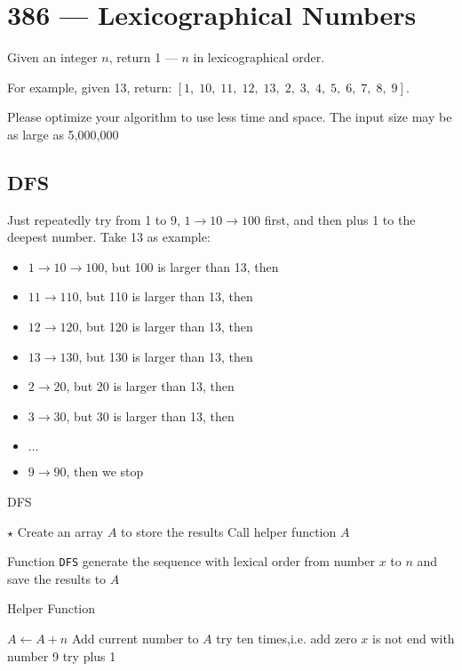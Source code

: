 \section{386 --- Lexicographical Numbers}
Given an integer $n$, return 1 --- $n$ in lexicographical order.
\par
For example, given 13, return: $[1,\;10,\;11,\;12,\;13,\;2,\;3,\;4,\;5,\;6,\;7,\;8,\;9]$.
\par
Please optimize your algorithm to use less time and space. The input size may be as large as 5,000,000

\subsection{DFS}
Just repeatedly try from 1 to 9, $1 \to 10 \to 100$ first, and then plus 1 to the deepest number. Take 13 as example:
\begin{itemize}
\item $1\to 10 \to 100$, but 100 is larger than 13, then
\item $11\to 110$, but 110 is larger than 13, then
\item $12\to 120$, but 120 is larger than 13, then
\item $13\to 130$, but 130 is larger than 13, then
\item $2 \to 20$, but 20 is larger than 13, then
\item $3 \to 30$, but 30 is larger than 13, then
\item $\ldots$
\item $9\to 90$, then we stop
\end{itemize}

\setcounter{algorithm}{0}
\begin{algorithm}[H]
\caption{DFS}
\begin{algorithmic}[1]
\State $\star$ Create an array $A$ to store the results
\State {} \Comment Call helper function
\State \Return $A$
\EndProcedure
\end{algorithmic}
\end{algorithm}

Function \texttt{DFS} generate the sequence with lexical order from number $x$ to $n$ and save the results to $A$

\begin{algorithm}[H]
\caption{Helper Function}
\begin{algorithmic}[1]
\State \Return
\EndIf
{}
\end{algorithmic}
\end{algorithm}
\begin{algorithm}[H]
\begin{algorithmic}[1]
\State $A\gets A+n$ \Comment Add current number to $A$
\State {} \Comment try ten times,i.e. add zero
 \Comment $x$ is not end with number 9
\State {} \Comment try plus 1
\EndIf
\EndFunction
\end{algorithmic}
\end{algorithm}

